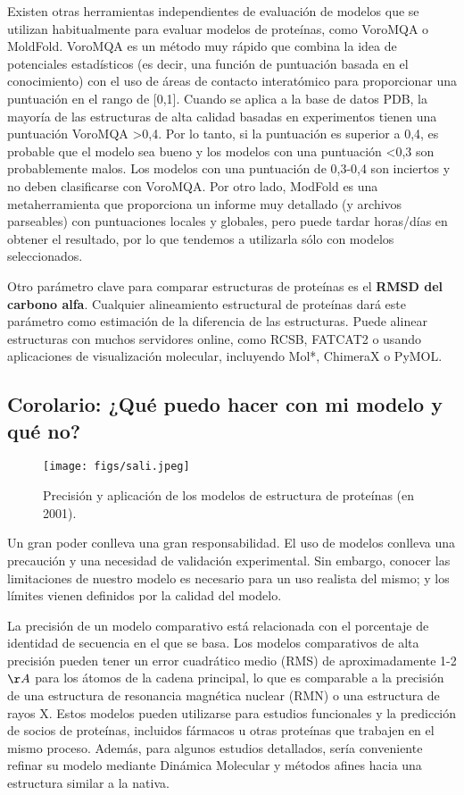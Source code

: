 Existen otras herramientas independientes de evaluación de modelos que se utilizan habitualmente para evaluar modelos de proteínas, como VoroMQA o MoldFold. VoroMQA es un método muy rápido que combina la idea de potenciales estadísticos (es decir, una función de puntuación basada en el conocimiento) con el uso de áreas de contacto interatómico para proporcionar una puntuación en el rango de [0,1]. Cuando se aplica a la base de datos PDB, la mayoría de las estructuras de alta calidad basadas en experimentos tienen una puntuación VoroMQA >0,4. Por lo tanto, si la puntuación es superior a 0,4, es probable que el modelo sea bueno y los modelos con una puntuación <0,3 son probablemente malos. Los modelos con una puntuación de 0,3-0,4 son inciertos y no deben clasificarse con VoroMQA. Por otro lado, ModFold es una metaherramienta que proporciona un informe muy detallado (y archivos parseables) con puntuaciones locales y globales, pero puede tardar horas/días en obtener el resultado, por lo que tendemos a utilizarla sólo con modelos seleccionados.

Otro parámetro clave para comparar estructuras de proteínas es el \textbf{RMSD del carbono alfa}. Cualquier alineamiento estructural de proteínas dará este parámetro como estimación de la diferencia de las estructuras. Puede alinear estructuras con muchos servidores online, como RCSB, FATCAT2 o usando aplicaciones de visualización molecular, incluyendo Mol*, ChimeraX o PyMOL.

\subsection{Corolario: ¿Qué puedo hacer con mi modelo y qué no?}
\begin{figure}[h]
\centering
\texttt{[image: figs/sali.jpeg]}
\caption{Precisión y aplicación de los modelos de estructura de proteínas (en 2001).}
\end{figure}

Un gran poder conlleva una gran responsabilidad. El uso de modelos conlleva una precaución y una necesidad de validación experimental. Sin embargo, conocer las limitaciones de nuestro modelo es necesario para un uso realista del mismo; y los límites vienen definidos por la calidad del modelo.

La precisión de un modelo comparativo está relacionada con el porcentaje de identidad de secuencia en el que se basa. Los modelos comparativos de alta precisión pueden tener un error cuadrático medio (RMS) de aproximadamente 1-2 $\AA$ para los átomos de la cadena principal, lo que es comparable a la precisión de una estructura de resonancia magnética nuclear (RMN) o una estructura de rayos X. Estos modelos pueden utilizarse para estudios funcionales y la predicción de socios de proteínas, incluidos fármacos u otras proteínas que trabajen en el mismo proceso. Además, para algunos estudios detallados, sería conveniente refinar su modelo mediante Dinámica Molecular y métodos afines hacia una estructura similar a la nativa. 

